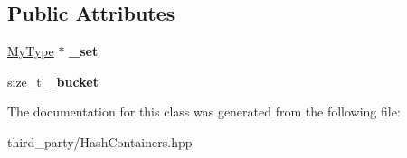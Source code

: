 \subsection*{Public Attributes}
\begin{DoxyCompactItemize}
\item 
\hypertarget{classemlib_1_1_hash_set_1_1iterator_af5e8cf31b2ce7567932aa1f8c44f4219}{\hyperlink{classemlib_1_1_hash_set}{My\+Type} $\ast$ {\bfseries \+\_\+set}}\label{classemlib_1_1_hash_set_1_1iterator_af5e8cf31b2ce7567932aa1f8c44f4219}

\item 
\hypertarget{classemlib_1_1_hash_set_1_1iterator_aff615f5180b0a2e76ff027256c25af73}{size\+\_\+t {\bfseries \+\_\+bucket}}\label{classemlib_1_1_hash_set_1_1iterator_aff615f5180b0a2e76ff027256c25af73}

\end{DoxyCompactItemize}


The documentation for this class was generated from the following file\+:\begin{DoxyCompactItemize}
\item 
third\+\_\+party/Hash\+Containers.\+hpp\end{DoxyCompactItemize}
